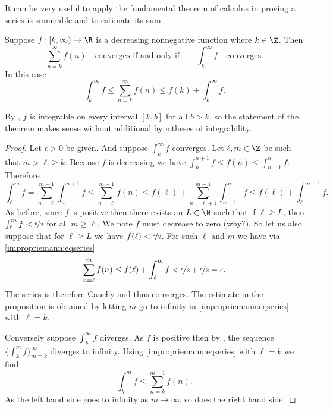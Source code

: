 \documentclass[12pt]{book}
\begin{document}
It can be very useful to apply the fundamental theorem 
of calculus in proving a series is summable and to estimate its sum.

\begin{prop}
Suppose $f \colon [k,\infty) \to \R$ is a decreasing nonnegative
function where $k \in \Z$.
Then
\begin{equation*}
\sum_{n=k}^\infty f(n)
\quad \text{converges if and only if}
\qquad
\int_k^\infty f
\quad \text{converges}.
\end{equation*}
In this case 
\begin{equation*}
\int_k^\infty f
\leq
\sum_{n=k}^\infty f(n)
\leq
f(k)+
\int_k^\infty f .
\end{equation*}
\end{prop}

By , $f$ is integrable
on every interval $[k,b]$ for all $b > k$, so the statement of the theorem
makes sense without additional hypotheses of integrability.

\begin{proof}
Let $\epsilon > 0$ be given.
And suppose $\int_k^\infty f$ converges.
Let $\ell, m \in \Z$ be such that $m > \ell \geq k$.
Because $f$ is decreasing we have
$\int_{n}^{n+1} f \leq f(n) \leq \int_{n-1}^{n} f$.
Therefore
\begin{equation} \label{impropriemann:eqseries}
\int_\ell^m f
=
\sum_{n=\ell}^{m-1} \int_{n}^{n+1} f
\leq
\sum_{n=\ell}^{m-1} f(n)
\leq
f(\ell) +
\sum_{n=\ell+1}^{m-1} \int_{n-1}^{n} f
\leq
f(\ell)+
\int_\ell^{m-1} f .
\end{equation}
As before, since $f$ is positive then there exists
an $L \in \N$ such that if $\ell \geq L$, then
$\int_\ell^{m} f < \nicefrac{\epsilon}{2}$ for all $m \geq \ell$.
We note 
$f$ must decrease to zero (why?).
So let us also suppose
that for $\ell \geq L$ we have $f(\ell) < \nicefrac{\epsilon}{2}$.
For such $\ell$ and $m$ we have via \eqref{impropriemann:eqseries}
\begin{equation*}
\sum_{n=\ell}^{m} f(n)
\leq
f(\ell)+
\int_\ell^{m} f < \nicefrac{\epsilon}{2} + \nicefrac{\epsilon}{2} = \epsilon .
\end{equation*}
The series is therefore Cauchy and thus converges.
The estimate in the
proposition is obtained by letting $m$ go to infinity in
\eqref{impropriemann:eqseries} with $\ell = k$.

Conversely suppose $\int_k^\infty f$ diverges.
As $f$ is positive then by
,
the sequence $\{ \int_k^m f \}_{m=k}^\infty$ diverges to infinity.
Using
\eqref{impropriemann:eqseries} with $\ell = k$ we find
\begin{equation*}
\int_k^m f
\leq
\sum_{n=k}^{m-1} f(n) .
\end{equation*}
As the left hand side goes to infinity as $m \to \infty$, so does the right
hand side.
\end{proof}
\end{document}
